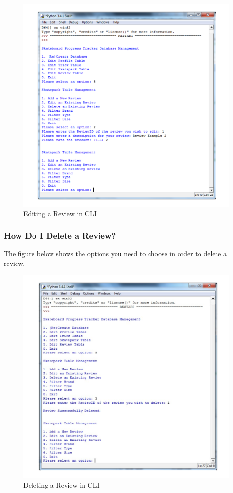 \begin{figure}[H]
    \includegraphics[width=\textwidth]{./Manual/Images/EditReview.pdf}
    \caption{Editing a Review in CLI} \label{fig:Edit Review}
\end{figure}


\subsubsection{How Do I Delete a Review?}

The figure below shows the options you need to choose in order to delete a review.

\begin{figure}[H]
    \includegraphics[width=\textwidth]{./Manual/Images/DeleteReview.pdf}
    \caption{Deleting a Review in CLI} \label{fig:Delete Review}
\end{figure}


